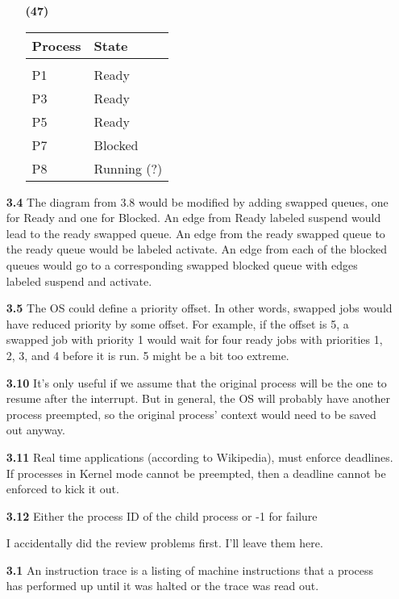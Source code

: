\documentclass{article}
\begin{document}
\begin{enumerate}
\begin{enumerate}
    \item[\textbf{(47)}]
      \begin{tabular}{l | l}
      \textbf{Process} & \textbf{State} \\
      \hline \\
      P1 & Ready \\
      P3 & Ready \\
      P5 & Ready \\
      P7 & Blocked \\
      P8 & Running (?) \\
      \end{tabular}
  \end{enumerate}

\item[\textbf{3.4}]
The diagram from 3.8 would be modified by adding swapped queues, one for Ready
and one for Blocked. An edge from Ready labeled suspend would lead to the ready
swapped queue. An edge from the ready swapped queue to the ready queue would be
labeled activate. An edge from each of the blocked queues would go to a
corresponding swapped blocked queue with edges labeled suspend and activate.

\item[\textbf{3.5}]
The OS could define a priority offset. In other words, swapped jobs would have
reduced priority by some offset. For example, if the offset is 5, a swapped job
with priority 1 would wait for four ready jobs with priorities 1, 2, 3, and 4
before it is run. 5 might be a bit too extreme.

\item[\textbf{3.10}]
It's only useful if we assume that the original process will be the one to
resume after the interrupt. But in general, the OS will probably
have another process preempted, so the original process' context would need to
be saved out anyway.

\item[\textbf{3.11}]
Real time applications (according to Wikipedia), must enforce deadlines. If
processes in Kernel mode cannot be preempted, then a deadline cannot be
enforced to kick it out.

\item[\textbf{3.12}]
Either the process ID of the child process or -1 for failure

I accidentally did the review problems first. I'll leave them here.

\item[\textbf{3.1}]
An instruction trace is a listing of machine instructions that a
process has performed up until it was halted or the trace was read
out.


\end{enumerate}
\end{document}
